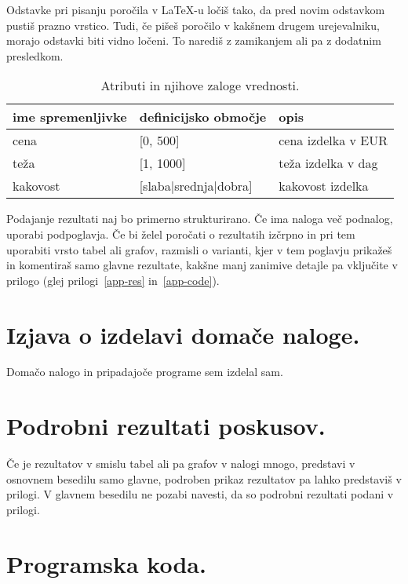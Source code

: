 \documentclass[a4paper,11pt]{article}
\begin{document}
Odstavke pri pisanju poročila v LaTeX-u ločiš tako, da pred novim
odstavkom pustiš prazno vrstico. Tudi, če pišeš poročilo v kakšnem
drugem urejevalniku, morajo odstavki biti vidno ločeni. To narediš z
zamikanjem ali pa z dodatnim presledkom.

\begin{table}[htbp]
\caption{Atributi in njihove zaloge vrednosti.}
\label{tab1}
\begin{center}
\begin{tabular}{llp{3cm}}
\hline
ime spremenljivke & definicijsko območje & opis \\
\hline
cena & [0, 500] & cena izdelka v EUR\\
teža & [1, 1000] & teža izdelka v dag \\
kakovost & [slaba|srednja|dobra] & kakovost izdelka \\
\hline
\end{tabular}
\end{center}
\end{table}

Podajanje rezultati naj bo primerno strukturirano. Če ima naloga več
podnalog, uporabi podpoglavja. Če bi želel poročati o rezultatih
izčrpno in pri tem uporabiti vrsto tabel ali grafov, razmisli o
varianti, kjer v tem poglavju prikažeš in komentiraš samo glavne
rezultate, kakšne manj zanimive detajle pa vključite v prilogo (glej
prilogi~\ref{app-res} in~\ref{app-code}).

\section{Izjava o izdelavi domače naloge.}
Domačo nalogo in pripadajoče programe sem izdelal sam.

\appendix
\appendixpage
\section{\label{app-res}Podrobni rezultati poskusov.}

Če je rezultatov v smislu tabel ali pa grafov v nalogi mnogo,
predstavi v osnovnem besedilu samo glavne, podroben prikaz
rezultatov pa lahko predstaviš v prilogi. V glavnem besedilu ne
pozabi navesti, da so podrobni rezultati podani v prilogi.

\section{\label{app-code}Programska koda.}
\end{document}
